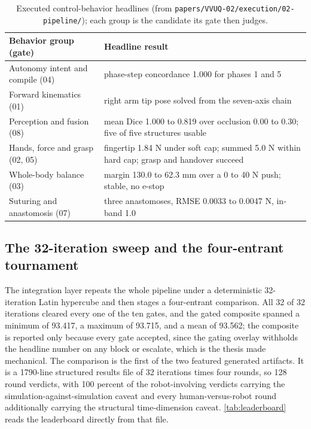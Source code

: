 \begin{table}[H]
\caption{Executed control-behavior headlines (from
\texttt{papers/VVUQ-02/execution/02-pipeline/}); each group is the candidate its
gate then judges.}
\label{tab:behaviors}
\centering
\footnotesize
\begin{tabularx}{\textwidth}{L{4.2cm} Y}
\toprule
\textbf{Behavior group (gate)} & \textbf{Headline result} \\
\midrule
Autonomy intent and compile (04) & phase-step concordance 1.000 for phases 1 and 5 \\
Forward kinematics (01) & right arm tip pose solved from the seven-axis chain \\
Perception and fusion (08) & mean Dice 1.000 to 0.819 over occlusion 0.00 to 0.30; five of five structures usable \\
Hands, force and grasp (02, 05) & fingertip 1.84 N under soft cap; summed 5.0 N within hard cap; grasp and handover succeed \\
Whole-body balance (03) & margin 130.0 to 62.3 mm over a 0 to 40 N push; stable, no e-stop \\
Suturing and anastomosis (07) & three anastomoses, RMSE 0.0033 to 0.0047 N, in-band 1.0 \\
\bottomrule
\end{tabularx}
\end{table}

\subsection{The 32-iteration sweep and the four-entrant tournament}

The integration layer repeats the whole pipeline under a deterministic
32-iteration Latin hypercube and then stages a four-entrant comparison. All 32 of
32 iterations cleared every one of the ten gates, and the gated composite spanned
a minimum of 93.417, a maximum of 93.715, and a mean of 93.562; the composite is
reported only because every gate accepted, since the gating overlay withholds the
headline number on any block or escalate, which is the thesis made mechanical.
The comparison is the first of the two featured generated artifacts. It is a
1790-line structured results file of 32 iterations times four rounds, so 128
round verdicts, with 100 percent of the robot-involving verdicts carrying the
simulation-against-simulation caveat and every human-versus-robot round
additionally carrying the structural time-dimension caveat.
\autoref{tab:leaderboard} reads the leaderboard directly from that file.

